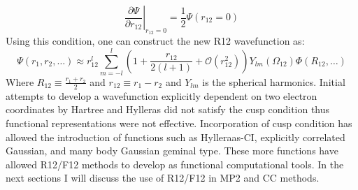       \begin{equation}
          \left. \frac{\partial \Psi}{\partial r_{12}} \right |_{r_{12}=0} = \frac{1}{2} \Psi(r_{12}=0)
        \end{equation}
    Using this condition, one can construct the new R12 wavefunction as: %
      \begin{equation}
        \Psi(r_1, r_2, \dots) \approx r^l_{12} \sum_{m=-l}^l\left( 1 + \frac{r_{12}}{2(l+1)} + \mathcal{O}(r^2_{12})\right) Y_{lm}(\Omega_{12})\Phi(R_{12},\dots)
      \end{equation}
    Where $R_{12} \equiv \frac{r_1 + r_2}{2}$ and $r_{12} \equiv r_1 - r_2$ and $Y_{lm}$ is the spherical harmonics.
    Initial attempts to develop a wavefunction explicitly dependent on two electron coordinates by Hartree\cite{Hartree1928a,Hartree1928b} and Hylleras\cite{Hylleraas1929} did not satisfy the cusp condition thus functional representations were not effective. Incorporation of cusp condition has allowed the introduction of functions such as Hylleraas-CI, explicitly correlated Gaussian, and many body Gaussian geminal type\cite{Kong2012}. These more functions have allowed R12/F12 methods to develop as functional computational tools.
    In the next sections I will discuss the use of R12/F12 in MP2 and CC methods.
